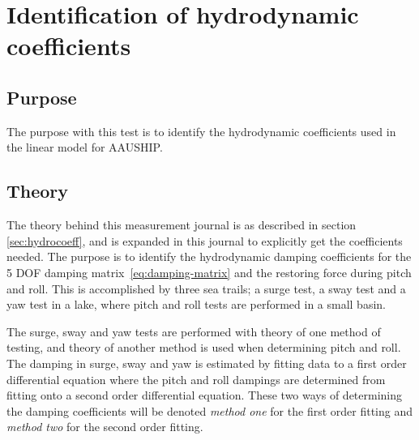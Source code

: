 \chapter{Identification of hydrodynamic coefficients}
\label{app:damping}

\section{Purpose}
The purpose with this test is to
identify the hydrodynamic coefficients used in the linear model for
AAUSHIP.

\section{Theory} The theory behind this measurement journal is as
described in section \ref{sec:hydrocoeff}, and is expanded in this
journal to explicitly get the coefficients needed. The purpose is to
identify the hydrodynamic damping coefficients for the 5 \ac{DOF} damping
matrix~\vref{eq:damping-matrix} and the restoring force during pitch and roll. This is accomplished by
three sea trails; a surge test, a sway test and a yaw
test in a lake, where pitch and roll tests are performed in a small basin.




The surge, sway and yaw tests are performed with theory of one method of testing, and theory of another method is used when determining pitch and roll. The damping in surge, sway and yaw is estimated by fitting data to a first order differential equation where the pitch and roll dampings are determined from fitting onto a second order differential equation. These two ways of determining the damping coefficients will be denoted \textit{method one} for the first order fitting and \textit{method two} for the second order fitting.

